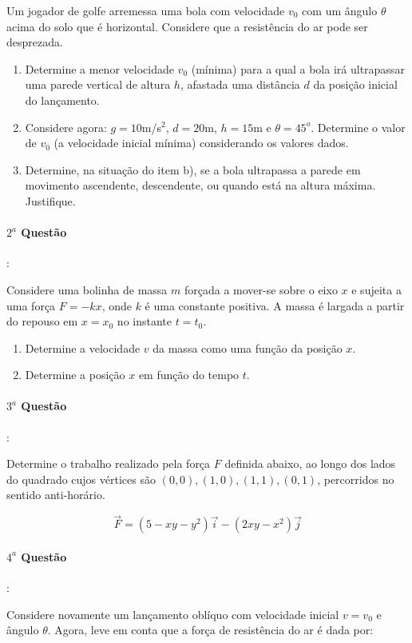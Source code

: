 \documentclass[12pt,a4paper]{article}
\begin{document}
Um jogador de golfe arremessa uma bola com velocidade $v_0$ com um ângulo $\theta$ acima do solo que é horizontal. Considere que a resistência do ar
pode ser desprezada. 
\begin{enumerate}[label=\alph*)]
\item Determine a menor velocidade $v_0$ (mínima) para a qual a bola irá ultrapassar uma parede vertical de altura $h$, afastada uma distância $d$ da posição inicial do lançamento.
\item Considere agora: $g=10$m/s$^2$, $d=20$m, $h=15$m e $\theta = 45^o$. Determine o valor de $v_0$ (a velocidade inicial mínima) considerando os valores dados.
\item Determine, na situação do item b), se a bola ultrapassa a parede em movimento ascendente, descendente, ou quando está na altura máxima. Justifique.
\end{enumerate}

\paragraph{$2^a$ Questão}:

Considere uma bolinha de massa $m$ forçada a mover-se sobre o eixo $x$ e sujeita a uma força $F=-kx$, onde $k$ é uma constante positiva. A massa é largada a partir do repouso em $x=x_0$ no instante $t=t_0$.
\begin{enumerate}[label=\alph*)]
\item Determine a velocidade $v$ da massa como uma função da posição $x$.
\item Determine a posição $x$ em função do tempo $t$.
\end{enumerate}
\paragraph{$3^a$ Questão}:

Determine o trabalho realizado pela força $F$ definida abaixo, ao longo dos lados do quadrado cujos vértices são $(0,0),(1,0),(1,1),(0,1)$, percorridos no sentido anti-horário.

$$ \overrightarrow{F}= (5-xy-y^2)\overrightarrow{i}-(2xy-x^2)\overrightarrow{j}$$

\paragraph{$4^a$ Questão}:

Considere novamente um lançamento oblíquo com velocidade inicial $v=v_0$ e ângulo $\theta$. Agora, leve em conta que a força de resistência do ar é dada por:
\end{document}
